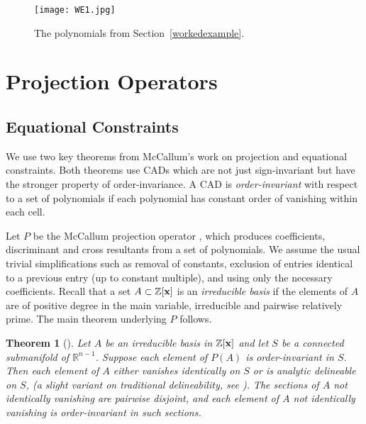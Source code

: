 \documentclass{article}
\newtheorem{theorem}{Theorem}
\begin{document}
\begin{figure}
\caption{The polynomials from Section~\ref{workedexample}.}\label{fig:workedexample1}
\begin{center}
\texttt{[image: WE1.jpg]}
\end{center}
\vskip-20pt
\end{figure}



\section{Projection Operators}
\label{sec:Project}

\subsection{Equational Constraints}
\label{subsec:EC}

We use two key theorems from McCallum's work on projection and equational constraints.  Both theorems use CADs which are not just sign-invariant but have the stronger property of order-invariance.  A CAD is {\em order-invariant} with respect to a set of polynomials if each polynomial has constant order of vanishing within each cell.

Let $P$ be the McCallum projection operator \cite{McCallum1988}, which produces coefficients, discriminant and cross resultants from a set of polynomials.  We assume the usual trivial simplifications such as removal of constants, exclusion of entries identical to a previous entry (up to constant multiple), and using only the necessary coefficients. 
Recall that a set $A \subset \mathbb{Z}[{\bf x}]$ is an {\em irreducible basis}
if the elements of $A$ are of positive degree in the main variable, irreducible and pairwise relatively prime. 
The main theorem underlying $P$ follows. 

\begin{theorem}[\cite{McCallum1998}]\label{DJW:theorem:SMcCTheorem1}
Let $A$ be an irreducible basis in $\mathbb{Z}[{\bf x}]$ and let $S$ be a connected submanifold of $\mathbb{R}^{n-1}$. Suppose each element of $P(A)$  is order-invariant in $S$.
\noindent Then each element of $A$ either vanishes identically on $S$ or is analytic delineable on $S$, (a slight variant on traditional delineability, see \cite{McCallum1998}). The sections of $A$ not identically vanishing are pairwise disjoint, and each element of $A$ not identically vanishing is order-invariant in such sections.  
\end{theorem}
\end{document}
